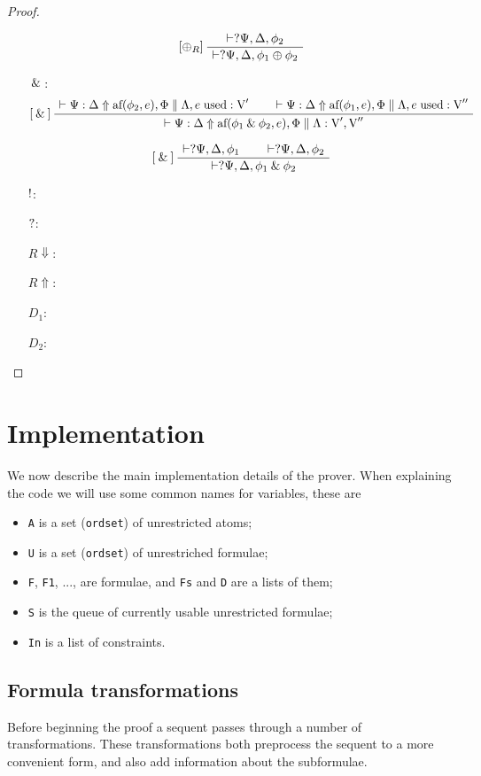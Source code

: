 \documentclass[a4paper, 12pt, english]{report}
\begin{document}
\begin{proof}
\begin{itemize}
			$$
			\AxiomC{$\vdash \llwn{\Psi}, \Delta, \phi_2$}
			\LeftLabel{$[\llplus_R]$}
			\UnaryInfC{$\vdash \llwn{\Psi}, \Delta, \phi_1 \llplus \phi_2$}
			\DisplayProof
			$$
		\item[$\:\&\:$:]
			$$
			\AxiomC{$\async{\Psi}{\Delta}{\af{\phi_2}{e}, \Phi} \separator \constr{\Lambda, \used{e}}{\text{V}'}$}
			\AxiomC{$\async{\Psi}{\Delta}{\af{\phi_1}{e}, \Phi} \separator \constr{\Lambda, \used{e}}{\text{V}''}$}
			\LeftLabel{$[\llwith]$}
			\BinaryInfC{$\async{\Psi}{\Delta}{\af{\phi_1 \llwith \phi_2}{e}, \Phi} \separator \constr{\Lambda}{\text{V}', \text{V}''}$}	%
			\DisplayProof
			$$

			$$
			\AxiomC{$\vdash \llwn{\Psi}, \Delta, \phi_1$}
			\AxiomC{$\vdash \llwn{\Psi}, \Delta, \phi_2$}
			\LeftLabel{$[\llwith]$}
			\BinaryInfC{$\vdash \llwn{\Psi}, \Delta, \phi_1 \llwith \phi_2$}
			\DisplayProof
			$$
		\item[$\llbang$:]
		\item[$\llwn$:]
		\item[$R\!\Downarrow$:]
		\item[$R\!\Uparrow$:]
		\item[$D_1$:]
		\item[$D_2$:]
	\end{itemize}
\end{proof}

\chapter{Implementation}
We now describe the main implementation details of the prover.
When explaining the code we will use some common names for variables, these are
\begin{itemize}
	\item \texttt{A} is a set (\texttt{ordset}) of unrestricted atoms;
	\item \texttt{U} is a set (\texttt{ordset}) of unrestriched formulae;
	\item \texttt{F}, \texttt{F1}, ..., are formulae, and \texttt{Fs} and \texttt{D} are a lists of them;
	\item \texttt{S} is the queue of currently usable unrestricted formulae;
	\item \texttt{In} is a list of constraints.
\end{itemize}

\section{Formula transformations}
Before beginning the proof a sequent passes through a number of transformations.
These transformations both preprocess the sequent to a more convenient form, and also add information about the subformulae.
\end{document}
